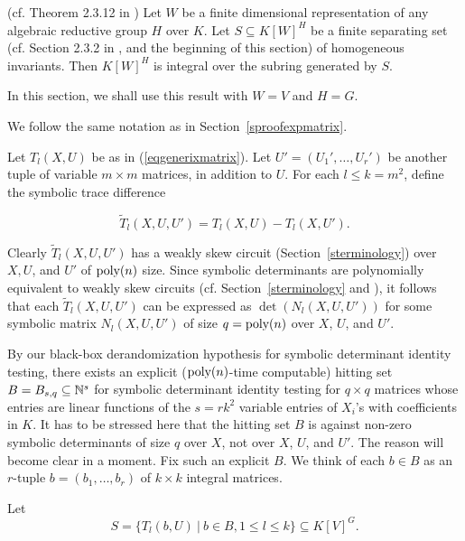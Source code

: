 \documentclass[11pt]{article}
\begin{document}
\begin{theorem} (cf. Theorem 2.3.12 in \cite{derksenbook}) \label{tsepderksen}
Let $W$ be a finite dimensional representation of any 
algebraic reductive group $H$ over 
$K$. Let $S \subseteq K[W]^H$ be a finite separating set (cf. Section 2.3.2 in   \cite{derksenbook}, and the beginning 
of this section) of homogeneous invariants.
Then $K[W]^H$ is integral over the subring generated by $S$.
\end{theorem}


In this section, we shall use this result with $W=V$ and $H=G$. 


We follow  the same notation as in Section~\ref{sproofexpmatrix}.

Let $T_l(X,U)$ be as in (\ref{eqgenerixmatrix}).
Let $U'=(U_1',\ldots,U_r')$ be another tuple of variable $m\times m$ matrices, in addition to $U$. 
For each $l \le k=m^2$, define  the symbolic trace difference

\begin{equation} \label{eqtildet}
  \tilde T_l(X,U,U')= T_l(X,U) - T_l(X,U'). 
\end{equation}

Clearly $\tilde T_l(X,U,U')$ has a weakly skew circuit (Section~\ref{sterminology})
over $X,U$, and $U'$   of ${\mbox {poly}}(n)$ size. 
Since symbolic determinants are polynomially equivalent to  weakly skew circuits 
(cf. Section~\ref{sterminology} and \cite{malod}), it follows that 
each $\tilde T_l(X,U,U')$ can be expressed as $\det(N_l(X,U,U'))$ for some symbolic matrix $N_l(X,U,U')$ 
of size $q={\mbox {poly}}(n)$  over $X$, $U$, and $U'$.

By our black-box derandomization hypothesis for symbolic determinant identity testing, there exists an explicit (${\mbox {poly}}(n)$-time computable) 
hitting set $B = B_{s,q} \subseteq \mathbb{N}^s$ for symbolic determinant identity testing  for   $q\times q$ matrices whose entries are 
linear functions of the $s=r k^2$ variable entries of $X_i$'s with coefficients in $K$.
It has to be stressed here that the hitting set $B$ is against non-zero
symbolic determinants of size $q$ over $X$, not over $X$, $U$, and $U'$. The reason will become clear in a moment.
Fix such an explicit $B$. We think of each $b\in B$ as an $r$-tuple $b=(b_1,\ldots,b_r)$ of $k\times k$ integral matrices.

Let 
\begin{equation} \label{eqSmatrix}
S = \{ T_l(b,U) \ | \ b \in B, 1 \le l \le k\} \subseteq K[V]^G. 
\end{equation}
\end{document}
